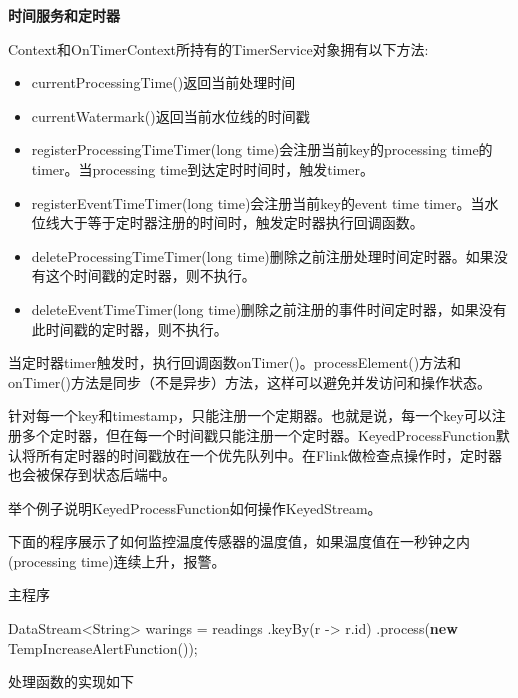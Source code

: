 \documentclass[cn,11pt,chinese]{elegantbook}
\newenvironment{Shaded}{}{}
\newcommand{\BuiltInTok}[1]{#1}
\newcommand{\FunctionTok}[1]{\textcolor[rgb]{0.02,0.16,0.49}{#1}}
\newcommand{\KeywordTok}[1]{\textcolor[rgb]{0.00,0.44,0.13}{\textbf{#1}}}
\newcommand{\NormalTok}[1]{#1}
\providecommand{\tightlist}{%
  \setlength{\itemsep}{0pt}\setlength{\parskip}{0pt}}
\begin{document}
\textbf{时间服务和定时器}

Context和OnTimerContext所持有的TimerService对象拥有以下方法:

\begin{itemize}
\tightlist
\item
  currentProcessingTime()返回当前处理时间
\item
  currentWatermark()返回当前水位线的时间戳
\item
  registerProcessingTimeTimer(long time)会注册当前key的processing
  time的timer。当processing time到达定时时间时，触发timer。
\item
  registerEventTimeTimer(long time)会注册当前key的event time
  timer。当水位线大于等于定时器注册的时间时，触发定时器执行回调函数。
\item
  deleteProcessingTimeTimer(long
  time)删除之前注册处理时间定时器。如果没有这个时间戳的定时器，则不执行。
\item
  deleteEventTimeTimer(long
  time)删除之前注册的事件时间定时器，如果没有此时间戳的定时器，则不执行。
\end{itemize}

当定时器timer触发时，执行回调函数onTimer()。processElement()方法和onTimer()方法是同步（不是异步）方法，这样可以避免并发访问和操作状态。

针对每一个key和timestamp，只能注册一个定期器。也就是说，每一个key可以注册多个定时器，但在每一个时间戳只能注册一个定时器。KeyedProcessFunction默认将所有定时器的时间戳放在一个优先队列中。在Flink做检查点操作时，定时器也会被保存到状态后端中。

举个例子说明KeyedProcessFunction如何操作KeyedStream。

下面的程序展示了如何监控温度传感器的温度值，如果温度值在一秒钟之内(processing
time)连续上升，报警。

主程序

\begin{Shaded}
\begin{Highlighting}[]
\NormalTok{DataStream\textless{}}\BuiltInTok{String}\NormalTok{\textgreater{} warings = readings}
\NormalTok{    .}\FunctionTok{keyBy}\NormalTok{(r {-}\textgreater{} r.}\FunctionTok{id}\NormalTok{)}
\NormalTok{    .}\FunctionTok{process}\NormalTok{(}\KeywordTok{new} \FunctionTok{TempIncreaseAlertFunction}\NormalTok{());}
\end{Highlighting}
\end{Shaded}

处理函数的实现如下
\end{document}
